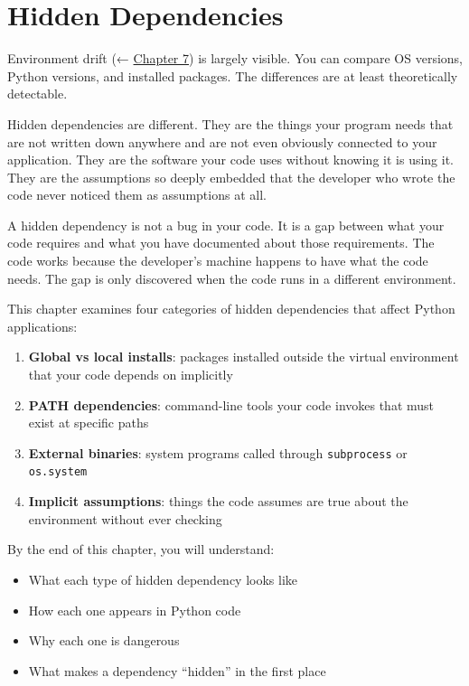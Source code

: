 \setcounter{chapter}{7}
\chapter{Hidden Dependencies}\label{ch:08-hidden-dependencies}

\chapterrule

Environment drift (← \hyperref[ch:07-environment-drift]{Chapter 7}) is largely visible. You can compare OS versions, Python versions, and installed packages. The differences are at least theoretically detectable.

Hidden dependencies are different. They are the things your program needs that are not written down anywhere and are not even obviously connected to your application. They are the software your code uses without knowing it is using it. They are the assumptions so deeply embedded that the developer who wrote the code never noticed them as assumptions at all.

A hidden dependency is not a bug in your code. It is a gap between what your code requires and what you have documented about those requirements. The code works because the developer's machine happens to have what the code needs. The gap is only discovered when the code runs in a different environment.

This chapter examines four categories of hidden dependencies that affect Python applications:

\begin{enumerate}
\def\labelenumi{\arabic{enumi}.}
\tightlist
\item
  \textbf{Global vs local installs}: packages installed outside the virtual environment that your code depends on implicitly
\item
  \textbf{PATH dependencies}: command-line tools your code invokes that must exist at specific paths
\item
  \textbf{External binaries}: system programs called through \texttt{subprocess} or \texttt{os.system}
\item
  \textbf{Implicit assumptions}: things the code assumes are true about the environment without ever checking
\end{enumerate}

\begin{objectives}

By the end of this chapter, you will understand:

\begin{itemize}
\tightlist
\item
  What each type of hidden dependency looks like
\item
  How each one appears in Python code
\item
  Why each one is dangerous
\item
  What makes a dependency ``hidden'' in the first place
\end{itemize}

\end{objectives}

